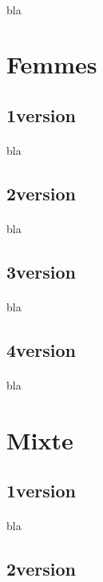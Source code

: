\paragraph{}
bla

\section{Femmes}
\subsection{1\ier version}
\paragraph{}
bla

\subsection{2\ieme version}
\paragraph{}
bla

\subsection{3\ieme version}
\paragraph{}
bla

\subsection{4\ieme version}
\paragraph{}
bla

\section{Mixte}
\subsection{1\ier version}
\paragraph{}
bla

\subsection{2\ieme version}
